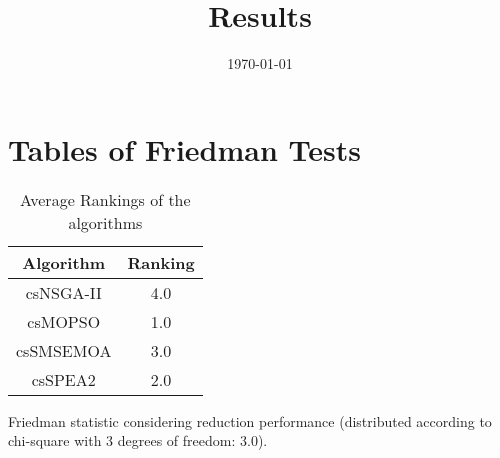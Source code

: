 \documentclass{article}
\title{Results}
\author{}
\date{\today}
\begin{document}
\oddsidemargin 0in \topmargin 0in\maketitle
\section{Tables of Friedman Tests}
\begin{table}[!htp]
\centering
\caption{Average Rankings of the algorithms
}\begin{tabular}{c|c}
Algorithm&Ranking\\
\hline
csNSGA-II&4.0\\
csMOPSO&1.0\\
csSMSEMOA&3.0\\
csSPEA2&2.0\\
\end{tabular}
\end{table}


Friedman statistic considering reduction performance (distributed according to chi-square with 3 degrees of freedom: 3.0).
\end{document}
